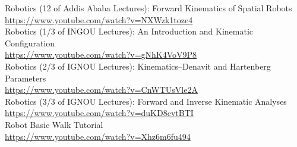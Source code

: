 \documentclass{article}
\begin{document}
\begin{thebibliography}{99}
	
	 Robotics (12 of Addis Ababa Lectures): Forward Kinematics of Spatial Robots\\
	\url{https://www.youtube.com/watch?v=NXWzk1toze4}\\
	
	Robotics (1/3 of INGOU Lectures): An Introduction and Kinematic Configuration\\
	\url{https://www.youtube.com/watch?v=gNhK4VoV9P8}\\
	
	Robotics (2/3 of IGNOU Lectures): Kinematics--Denavit and Hartenberg Parameters\\
	\url{https://www.youtube.com/watch?v=CnWTUsVle2A}\\
	
	Robotics (3/3 of IGNOU Lectures): Forward and Inverse Kinematic Analyses\\
	\url{https://www.youtube.com/watch?v=duKD8cvtBTI}\\
	
	Robot Basic Walk Tutorial\\
	\url{https://www.youtube.com/watch?v=Xhz6m6fu494}\\
	
\end{thebibliography}
\end{document}
